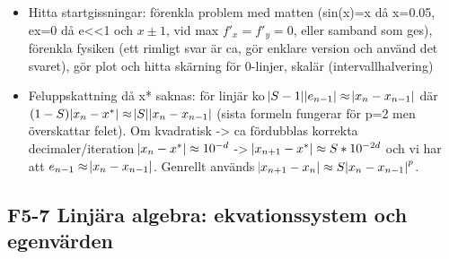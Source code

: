 \documentclass[a4paper]{article}
\begin{document}
\begin{itemize}
\begin{itemize}
\begin{itemize}
\begin{itemize}
            \end{itemize}
            \item Pro/Con: +kräver ej derivata, +lokalt ko för enkla rötter (ej multipel), +ko hastighet knappt 2, -kräver 2 bra startgissningar, -svårt för system
        \end{itemize}
                \item Namn: Modifierade Newtons metod
        \begin{itemize}
            \item Anta: NaN
            \item Metod: Newton men derivatan approximeras med framåt differans dvs $x_{n+1} = x_n - \frac{h f(x_n)}{f(x_n+h)-f(x_n)}$ 
            \item KO ordning: knappt 2 ty $g'(x^*)=O(h)$ 
            \item Pro/Con: +kräver ej derivata, +lokalt ko för små h, +ko nästan 2, +fungerar för system, -kräver 2 evalueringar/iteration, -känslig för val av h pga avrundningsfel (litet h->kancelation m.m pga dators precision, stort h->trunkeringsfel), -kräver bra startgissning 
        \end{itemize}
    \end{itemize}
    \item Hitta startgissningar: förenkla problem med matten (sin(x)=x då x=0.05, ex=0 då e<<1 och $x\pm 1$, vid max $f'_x=f'_y=0$, eller samband som ges), förenkla fysiken (ett rimligt svar är ca, gör enklare version och använd det svaret), gör plot och hitta skärning för 0-linjer, skalär (intervallhalvering)
    \item Feluppskattning då x* saknas: för linjär ko $\abs{S-1} \abs{e_{n-1}} \approx \abs{x_n-x_{n-1}}$ där $(1-S)\abs{x_n-x^*}\approx \abs{S} \abs{x_{n} - x_{n-1}}$ (sista formeln fungerar för p=2 men överskattar felet). Om kvadratisk -> ca fördubblas korrekta decimaler/iteration $\abs{x_n -x^*}\approx 10^{-d}$ -> $\abs{x_{n+1}-x^*}\approx S*10^{-2d}$ och vi har att $e_{n-1} \approx \abs{x_n-x_{n-1}}$. Genrellt används $\abs{x_{n+1}-x_n}\approx S \abs{x_n-x_{n-1}}^p$.
\end{itemize}

\subsection{F5-7 Linjära algebra: ekvationssystem och egenvärden}
\end{document}
